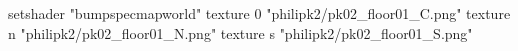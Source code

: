 setshader "bumpspecmapworld"
    texture 0 "philipk2/pk02_floor01_C.png"
    texture n "philipk2/pk02_floor01_N.png"
    texture s "philipk2/pk02_floor01_S.png"